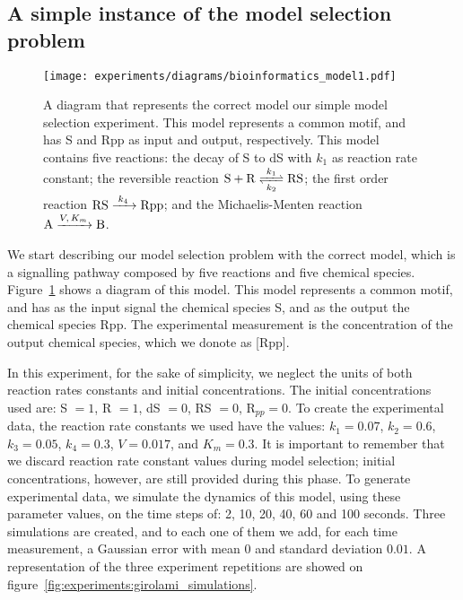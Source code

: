\subsection{A simple instance of the model selection problem}
\begin{figure}[h]
\begin{center}
    \texttt{[image: experiments/diagrams/bioinformatics\_model1.pdf]}
    \caption{A diagram that represents the correct model our simple
model selection experiment. This model represents a common motif, and
has S and Rpp as input and output, respectively. This model contains
five reactions: the decay of S to dS with $k_1$ as reaction rate
constant; the reversible reaction $\ce{S + R <=>[$k_1$][$k_2$] RS}$; the
first order reaction $\ce{RS ->[$k_4$] Rpp}$; and the Michaelis-Menten
reaction $\ce{A ->[$V, K_m$] B}$.}
    \label{fig:experiments:girolami_model1}
    \end{center}
\end{figure}

We start describing our model selection problem with the correct model,
which is a signalling pathway composed by five reactions and five 
chemical species. Figure~\ref{fig:experiments:girolami_model1} shows a 
diagram of this model. This model represents a common motif, and has
as the input signal the chemical species S, and as the output the
chemical species Rpp. The experimental measurement is the concentration
of the output chemical species, which we donote as [Rpp].

In this experiment, for the sake of simplicity, we neglect the units of 
both reaction rates constants and initial concentrations. The initial 
concentrations used are:  S $= 1$, R $= 1$, dS $= 0$, RS $= 0$, 
R$_{pp} = 0$. To create the experimental data, the reaction rate 
constants we used have the values: 
$k_1 = 0.07$, $k_2 = 0.6$, $k_3 = 0.05$, $k_4 = 0.3$, $V = 0.017$, and
$K_m = 0.3$. It is important to remember that we discard reaction rate
constant values during model selection; initial concentrations, however,
are still provided during this phase. To generate experimental data, we
simulate the dynamics of this model, using these parameter values, on
the time steps of: 2, 10, 20, 40, 60 and 100 seconds. Three simulations
are created, and to each one of them we add, for each time measurement,
a Gaussian error with mean $0$ and standard deviation $0.01$. A
representation of the three experiment repetitions are showed on 
figure~\ref{fig:experiments:girolami_simulations}.

